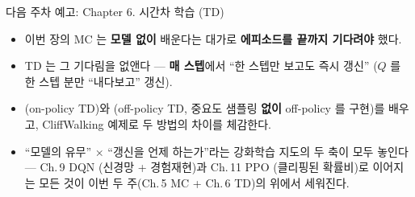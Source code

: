 \documentclass[aspectratio=169,11pt]{beamer}
\begin{document}
\begin{frame}{다음 주차 예고: Chapter 6. 시간차 학습 (TD)}
  \begin{itemize}
    \item 이번 장의 MC 는 \textbf{모델 없이} 배운다는 대가로
      \textbf{에피소드를 끝까지 기다려야} 했다.
    \item TD 는 그 기다림을 없앤다 --- \textbf{매 스텝}에서
      ``한 스텝만 보고도 즉시 갱신''
      ($Q$ 를 한 스텝 분만 ``내다보고'' 갱신).
    \item {} (on-policy TD)와 
      (off-policy TD, 중요도 샘플링 \textbf{없이} off-policy 를
      구현)를 배우고, CliffWalking 예제로 두 방법의 차이를
      체감한다.
    \item ``모델의 유무'' × ``갱신을 언제 하는가''라는
      강화학습 지도의 두 축이 모두 놓인다 --- Ch.\,9 DQN
      (신경망 + 경험재현)과 Ch.\,11 PPO (클리핑된 확률비)로
      이어지는 모든 것이 이번 두 주(Ch.\,5 MC + Ch.\,6 TD)의
      위에서 세워진다.
  \end{itemize}
\end{frame}
\end{document}
